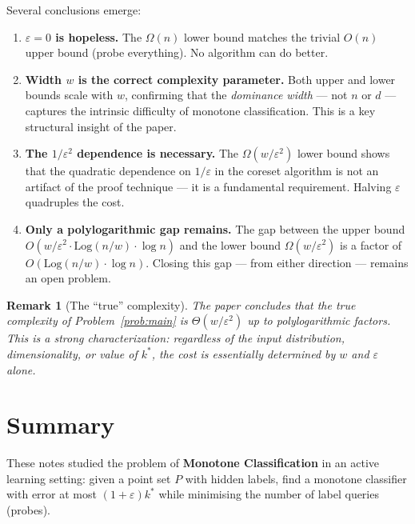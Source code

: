 \documentclass[11pt, a4paper]{article}
\theoremstyle{boxed}
\newtheorem{innerremark}{Remark}[section]
\newenvironment{remark}
  {\begin{mdframed}[style=notestyle]\begin{innerremark}}
  {\end{innerremark}\end{mdframed}}
\newcommand{\kstar}{k^{*}}
\begin{document}
\medskip
Several conclusions emerge:

\begin{enumerate}
  \item \textbf{$\varepsilon = 0$ is hopeless.} The $\Omega(n)$ lower bound matches the trivial $O(n)$ upper bound (probe everything). No algorithm can do better.

  \item \textbf{Width $w$ is the correct complexity parameter.} Both upper and lower bounds scale with $w$, confirming that the \emph{dominance width} --- not $n$ or $d$ --- captures the intrinsic difficulty of monotone classification. This is a key structural insight of the paper.

  \item \textbf{The $1/\varepsilon^2$ dependence is necessary.} The $\Omega(w/\varepsilon^2)$ lower bound shows that the quadratic dependence on $1/\varepsilon$ in the coreset algorithm is not an artifact of the proof technique --- it is a fundamental requirement. Halving $\varepsilon$ quadruples the cost.

  \item \textbf{Only a polylogarithmic gap remains.} The gap between the upper bound $O(w/\varepsilon^2 \cdot \mathrm{Log}(n/w) \cdot \log n)$ and the lower bound $\Omega(w/\varepsilon^2)$ is a factor of $O(\mathrm{Log}(n/w) \cdot \log n)$. Closing this gap --- from either direction --- remains an open problem.
\end{enumerate}

\begin{remark}[The ``true'' complexity]
  The paper concludes that the true complexity of Problem~\ref{prob:main} is $\Theta(w/\varepsilon^2)$ up to polylogarithmic factors. This is a strong characterization: regardless of the input distribution, dimensionality, or value of $\kstar$, the cost is essentially determined by $w$ and $\varepsilon$ alone.
\end{remark}

\section*{Summary}

These notes studied the problem of \textbf{Monotone Classification} in an active learning setting: given a point set $P$ with hidden labels, find a monotone classifier with error at most $(1+\varepsilon)k^*$ while minimising the number of label queries (probes).
\end{document}

